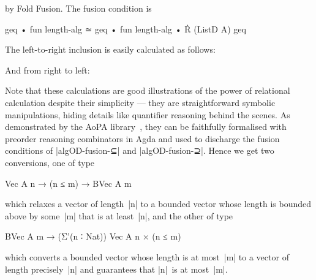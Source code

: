 by Fold Fusion.
The fusion condition is
\begin{code}
geq • fun length-alg ≃ geq • fun length-alg • Ṙ (ListD A) geq
\end{code}
The left-to-right inclusion is easily calculated as follows:
And from right to left:
Note that these calculations are good illustrations of the power of relational calculation despite their simplicity --- they are straightforward symbolic manipulations, hiding details like quantifier reasoning behind the scenes.
As demonstrated by the AoPA library~\citep{Mu-AoPA}, they can be faithfully formalised with preorder reasoning combinators in Agda and used to discharge the fusion conditions of |algOD-fusion-⊆| and |algOD-fusion-⊇|.
Hence we get two conversions, one of type
\begin{code}
Vec A n → (n ≤ m) → BVec A m
\end{code}
which relaxes a vector of length~|n| to a bounded vector whose length is bounded above by some~|m| that is at least~|n|, and the other of type
\begin{code}
BVec A m → (Σ'(n ∶ Nat)) Vec A n × (n ≤ m)
\end{code}
which converts a bounded vector whose length is at most~|m| to a vector of length precisely~|n| and guarantees that |n|~is at most~|m|.

